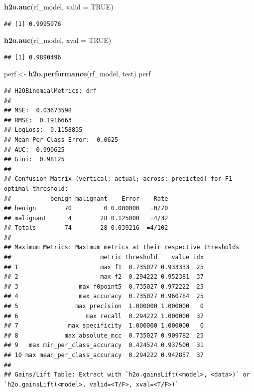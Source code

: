 \documentclass[]{article}
\newenvironment{Shaded}{\begin{snugshade}}{\end{snugshade}}
\newcommand{\KeywordTok}[1]{\textcolor[rgb]{0.13,0.29,0.53}{\textbf{{#1}}}}
\newcommand{\DataTypeTok}[1]{\textcolor[rgb]{0.13,0.29,0.53}{{#1}}}
\newcommand{\StringTok}[1]{\textcolor[rgb]{0.31,0.60,0.02}{{#1}}}
\newcommand{\OtherTok}[1]{\textcolor[rgb]{0.56,0.35,0.01}{{#1}}}
\newcommand{\NormalTok}[1]{{#1}}
\begin{document}
\begin{Shaded}
\begin{Highlighting}[]
\KeywordTok{h2o.auc}\NormalTok{(rf_model, }\DataTypeTok{valid =} \OtherTok{TRUE}\NormalTok{)}
\end{Highlighting}
\end{Shaded}

\begin{verbatim}
## [1] 0.9995976
\end{verbatim}

\begin{Shaded}
\begin{Highlighting}[]
\KeywordTok{h2o.auc}\NormalTok{(rf_model, }\DataTypeTok{xval =} \OtherTok{TRUE}\NormalTok{)}
\end{Highlighting}
\end{Shaded}

\begin{verbatim}
## [1] 0.9890496
\end{verbatim}

\begin{Shaded}
\begin{Highlighting}[]
\NormalTok{perf <-}\StringTok{ }\KeywordTok{h2o.performance}\NormalTok{(rf_model, test)}
\NormalTok{perf}
\end{Highlighting}
\end{Shaded}

\begin{verbatim}
## H2OBinomialMetrics: drf
## 
## MSE:  0.03673598
## RMSE:  0.1916663
## LogLoss:  0.1158835
## Mean Per-Class Error:  0.0625
## AUC:  0.990625
## Gini:  0.98125
## 
## Confusion Matrix (vertical: actual; across: predicted) for F1-optimal threshold:
##           benign malignant    Error    Rate
## benign        70         0 0.000000   =0/70
## malignant      4        28 0.125000   =4/32
## Totals        74        28 0.039216  =4/102
## 
## Maximum Metrics: Maximum metrics at their respective thresholds
##                         metric threshold    value idx
## 1                       max f1  0.735027 0.933333  25
## 2                       max f2  0.294222 0.952381  37
## 3                 max f0point5  0.735027 0.972222  25
## 4                 max accuracy  0.735027 0.960784  25
## 5                max precision  1.000000 1.000000   0
## 6                   max recall  0.294222 1.000000  37
## 7              max specificity  1.000000 1.000000   0
## 8             max absolute_mcc  0.735027 0.909782  25
## 9   max min_per_class_accuracy  0.424524 0.937500  31
## 10 max mean_per_class_accuracy  0.294222 0.942857  37
## 
## Gains/Lift Table: Extract with `h2o.gainsLift(<model>, <data>)` or `h2o.gainsLift(<model>, valid=<T/F>, xval=<T/F>)`
\end{verbatim}
\end{document}
